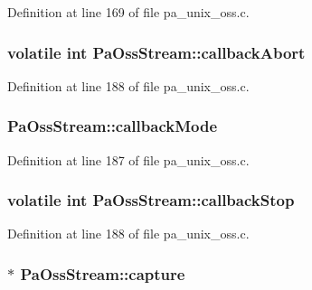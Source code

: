 Definition at line 169 of file pa\+\_\+unix\+\_\+oss.\+c.

\subsubsection[{\texorpdfstring{callback\+Abort}{callbackAbort}}]{\setlength{\rightskip}{0pt plus 5cm}volatile {\bf int} Pa\+Oss\+Stream\+::callback\+Abort}\hypertarget{struct_pa_oss_stream_a27bbffabcaa98b6302ffa2dbd1836f1a}{}\label{struct_pa_oss_stream_a27bbffabcaa98b6302ffa2dbd1836f1a}


Definition at line 188 of file pa\+\_\+unix\+\_\+oss.\+c.

\subsubsection[{\texorpdfstring{callback\+Mode}{callbackMode}}]{ Pa\+Oss\+Stream\+::callback\+Mode}\hypertarget{struct_pa_oss_stream_a20a58bc0a5255b639b1ea40fce962261}{}\label{struct_pa_oss_stream_a20a58bc0a5255b639b1ea40fce962261}


Definition at line 187 of file pa\+\_\+unix\+\_\+oss.\+c.

\subsubsection[{\texorpdfstring{callback\+Stop}{callbackStop}}]{\setlength{\rightskip}{0pt plus 5cm}volatile {\bf int} Pa\+Oss\+Stream\+::callback\+Stop}\hypertarget{struct_pa_oss_stream_af8fd6b50f04c65318fbc6ed298cc9520}{}\label{struct_pa_oss_stream_af8fd6b50f04c65318fbc6ed298cc9520}


Definition at line 188 of file pa\+\_\+unix\+\_\+oss.\+c.

\subsubsection[{\texorpdfstring{capture}{capture}}]{$\ast$ Pa\+Oss\+Stream\+::capture}\hypertarget{struct_pa_oss_stream_a8f72686fa2b8f688bb41363c6dcf097c}{}\label{struct_pa_oss_stream_a8f72686fa2b8f688bb41363c6dcf097c}


